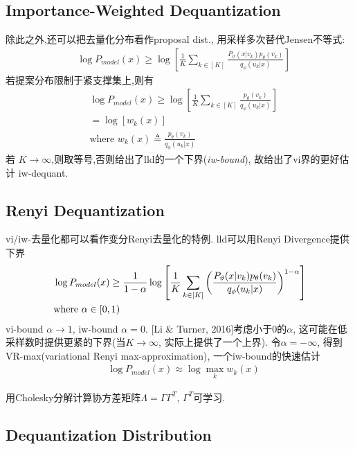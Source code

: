 \documentclass{article}
\begin{document}
\subsection{Importance-Weighted Dequantization}
    \newcommand{\lpx}{\log P_{model}(x)}

    除此之外,还可以把去量化分布看作proposal dist., 用采样多次替代Jensen不等式:
    \begin{align}
        &\lpx \ge \log\left[
            \frac{1}{K} \sum_{k\in[K]}\frac{P_\vartheta(x|v_k)p_\theta(v_k)}{q_\phi(u_k |x)}
        \right] 
    \end{align}
    若提案分布限制于紧支撑集上,则有
    \begin{align}
        &\lpx \ge \log\left[
            \frac{1}{K} \sum_{k\in[K]}\frac{p_\theta(v_k)}{q_\phi(u_k |x)}
        \right] \\
        &= \log\left[ w_k (x)\right] \\
        &\text{where } w_k(x)\triangleq \frac{p_\theta(v_k)}{q_\phi(u_k |x)}
    \end{align}
    若 $K\rightarrow \infty$,则取等号,否则给出了lld的一个下界(\textit{iw-bound}), 故给出了vi界的更好估计 \trarr iw-dequant.

\subsection{Renyi Dequantization}

    vi/iw-去量化都可以看作变分Renyi去量化的特例. lld可以用Renyi Divergence提供下界
    \begin{align}
        &\lpx \ge \frac{1}{1-\alpha} \log \left[
            \frac{1}{K}\sum_{k\in[K]} \left(
                \frac{P_\vartheta(x|v_k)p_\theta(v_k)}{q_\phi(u_k |x)}
            \right)^{1-\alpha}
        \right]\\
        &\where \alpha\in[0, 1)
    \end{align}
    vi-bound $\alpha\to 1$, iw-bound $\alpha=0$. [Li \& Turner, 2016]考虑小于0的$\alpha$, 这可能在低采样数时提供更紧的下界(当$K \to \infty$, 实际上提供了一个上界). 令$\alpha=-\infty$, 得到VR-max(variational Renyi max-approximation), 一个iw-bound的快速估计
    \begin{align}
        &\lpx \approx \log \max_k w_k(x) 
    \end{align}

     用Cholesky分解计算协方差矩阵$\Lambda = \Gamma \Gamma^T$, $\Gamma^T$可学习.

\subsection{Dequantization Distribution}
\end{document}
